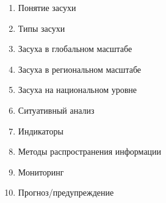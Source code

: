 \begin{enumerate}
	\item Понятие засухи
	\item Типы засухи
	\item Засуха в глобальном масштабе
	\item Засуха в региональном масштабе
	\item Засуха на национальном уровне
	\item Ситуативный анализ
	\item Индикаторы
	\item Методы распространения информации
	\item Мониторинг
	\item Прогноз/предупреждение
\end{enumerate}

